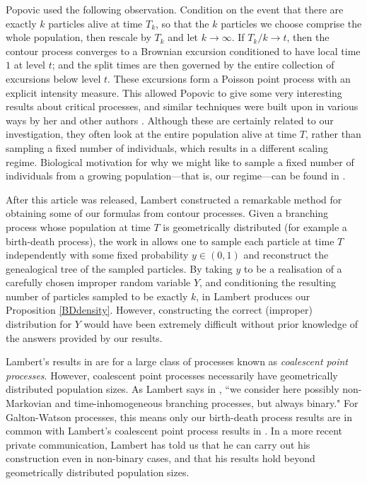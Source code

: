 \documentclass{article}
\theoremstyle{plain}
\theoremstyle{definition}
\begin{document}
Popovic \cite{popovic:asymptotic_genealogy_critical_bp} used the following observation. Condition on the event that there are exactly $k$ particles alive at time $T_k$, so that the $k$ particles we choose comprise the whole population, then rescale by $T_k$ and let $k\to\infty$. If $T_k/k\to t$, then the contour process converges to a Brownian excursion conditioned to have local time $1$ at level $t$; and the split times are then governed by the entire collection of excursions below level $t$. These excursions form a Poisson point process with an explicit intensity measure. This allowed Popovic to give some very interesting results about critical processes, and similar techniques were built upon in various ways by her and other authors \cite{aldous_popovic:critical_bp_biodiversity, gernhard:conditioned_reconstructed, lambert:contour_splitting_trees, lambert:coalescent_branching_trees}. Although these are certainly related to our investigation, they often look at the entire population alive at time $T$, rather than sampling a fixed number of individuals, which results in a different scaling regime. Biological motivation for why we might like to sample a fixed number of individuals from a growing population---that is, our regime---can be found in \cite{oconnell:genealogy_mrca}.

After this article was released, Lambert \cite{lambert:genealogy_binary} constructed a remarkable method for obtaining some of our formulas from contour processes. Given a branching process whose population at time $T$ is geometrically distributed (for example a birth-death process), the work in \cite{lambert_stadler:birth_death_cpp} allows one to sample each particle at time $T$ independently with some fixed probability $y\in(0,1)$ and reconstruct the genealogical tree of the sampled particles. By taking $y$ to be a realisation of a carefully chosen improper random variable $Y$, and conditioning the resulting number of particles sampled to be exactly $k$, in \cite{lambert:genealogy_binary} Lambert  produces our Proposition \ref{BDdensity}. However, constructing the correct (improper) distribution for $Y$ would have been extremely difficult without prior knowledge of the answers provided by our results.

Lambert's results in \cite{lambert:genealogy_binary} are for a large class of processes known as \emph{coalescent point processes}. However, coalescent point processes necessarily have geometrically distributed population sizes. As Lambert says in \cite{lambert:genealogy_binary}, ``we consider here possibly non-Markovian and time-inhomogeneous branching processes, but always binary." For Galton-Watson processes, this means only our birth-death process results are in common with Lambert's coalescent point process results in \cite{lambert:genealogy_binary}. In a more recent private communication, Lambert has told us that he can carry out his construction even in non-binary cases, and that his results hold beyond geometrically distributed population sizes.
\end{document}
